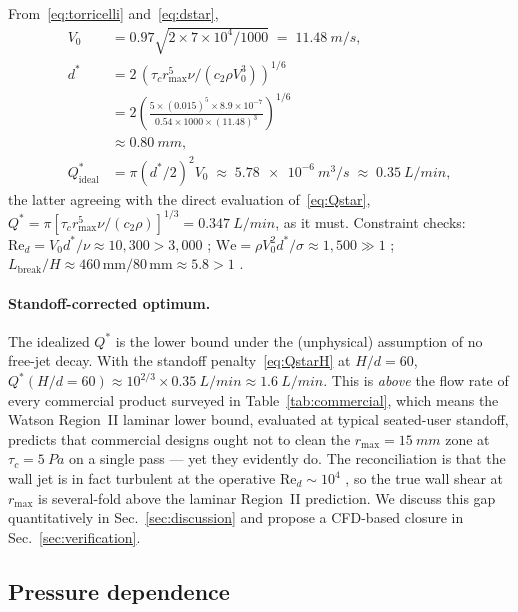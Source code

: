 \documentclass[aps,prfluids,reprint,amsmath,amssymb,floatfix]{revtex4-2}
\newcommand{\Rey}{\mathrm{Re}}
\newcommand{\We}{\mathrm{We}}
\begin{document}
From~\eqref{eq:torricelli} and~\eqref{eq:dstar},
\begin{align}
  V_0 &= 0.97\sqrt{2 \times 7\times 10^4/1000} \;=\; \SI{11.48}{m/s},\\
  d^* &= 2\,(\tau_c r_\mathrm{max}^5 \nu/(c_2\rho V_0^3))^{1/6}\nonumber\\
      &= 2\left(\frac{5 \times (0.015)^5 \times 8.9\times 10^{-7}}
              {0.54 \times 1000 \times (11.48)^3}\right)^{1/6}\nonumber\\
      &\approx \SI{0.80}{mm},\\
  Q^*_\mathrm{ideal} &= \pi (d^*/2)^2 V_0
                     \;\approx\; \SI{5.78e-6}{m^3/s}
                     \;\approx\; \SI{0.35}{L/min},
\end{align}
the latter agreeing with the direct evaluation of~\eqref{eq:Qstar},
$Q^* = \pi[\tau_c r_\mathrm{max}^5\nu/(c_2\rho)]^{1/3}
 = \SI{0.347}{L/min}$, as it must.
Constraint checks: $\Rey_d = V_0 d^*/\nu \approx 10{,}300 > 3{,}000$
\checkmark; $\We = \rho V_0^2 d^*/\sigma \approx 1{,}500 \gg 1$ \checkmark;
$L_\mathrm{break}/H \approx 460\,\mathrm{mm}/80\,\mathrm{mm} \approx 5.8 > 1$
\checkmark.

\paragraph{Standoff-corrected optimum.}
The idealized $Q^*$ is the lower bound under the (unphysical)
assumption of no free-jet decay. With the standoff
penalty~\eqref{eq:QstarH} at $H/d = 60$,
$Q^*(H/d{=}60) \approx 10^{2/3} \times \SI{0.35}{L/min}
 \approx \SI{1.6}{L/min}$.
This is \emph{above} the flow rate of every commercial product
surveyed in Table~\ref{tab:commercial}, which means the Watson
Region~II laminar lower bound, evaluated at typical seated-user
standoff, predicts that commercial designs ought not to clean the
$r_\mathrm{max} = \SI{15}{mm}$ zone at $\tau_c = \SI{5}{Pa}$ on a
single pass --- yet they evidently do. The reconciliation is that the
wall jet is in fact turbulent at the operative $\Rey_d \sim 10^4$
\citep{Phares2000}, so the true wall shear at $r_\mathrm{max}$ is
several-fold above the laminar Region~II prediction. We discuss this
gap quantitatively in Sec.~\ref{sec:discussion} and propose a CFD-based
closure in Sec.~\ref{sec:verification}.

\subsection{Pressure dependence}
\end{document}
